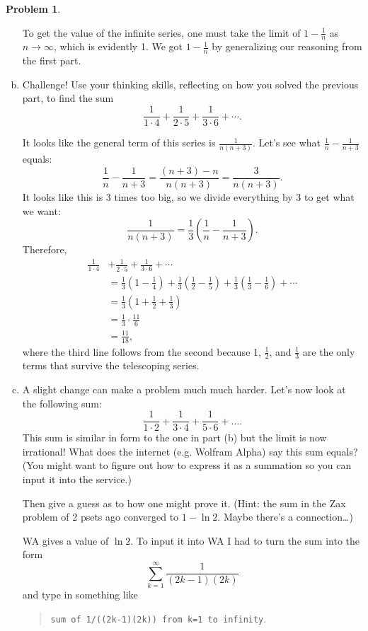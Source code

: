 \documentclass[11pt,oneside]{amsart}
\theoremstyle{definition}
\newtheorem{problem}{Problem}
\theoremstyle{plain}
\begin{document}
\begin{problem}
\begin{enumerate}[(a)]
\begin{solution}
          To get the value of the infinite series, one must take the limit of $1-\frac 1n$ as $n\to\infty$, which is evidently 1. We got $1-\frac 1n$ by generalizing our reasoning from the first part.
        \end{solution}
  \item Challenge! Use your thinking skills, reflecting on how you solved the previous part, to find the sum
        \[\frac1{1\cdot 4}+\frac 1{2\cdot 5}+\frac 1{3\cdot 6}+\cdots.\]
        \begin{solution}
          It looks like the general term of this series is $\frac 1{n(n+3)}$. Let's see what $\frac 1n-\frac 1{n+3}$ equals:
          \[\frac 1n-\frac 1{n+3}=\frac{(n+3)-n}{n(n+3)}=\frac 3{n(n+3)}.\]
          It looks like this is 3 times too big, so we divide everything by 3 to get what we want:
          \[\frac 1{n(n+3)}=\frac 13\left( \frac 1n-\frac 1{n+3} \right).\]
          Therefore,
          \[\begin{split}
              \frac 1{1\cdot 4}&+\frac 1{2\cdot 5}+\frac 1{3\cdot 6}+\cdots \\
              &=\frac 13\left( 1-\frac 14 \right)+\frac 13\left( \frac12-\frac 15 \right)+\frac 13\left( \frac13-\frac 16 \right)+\cdots\\
              &= \frac 13\left(1+\frac 12+\frac 13\right)\\
              &=\frac 13\cdot \frac{11}6\\
              &=\frac{11}{18},
            \end{split}\]
          where the third line follows from the second because 1, $\frac12$, and $\frac13$ are the only terms that survive the telescoping series.
        \end{solution}
  \item A slight change can make a problem much much harder. Let's now look at the following sum:
        \[\frac 1{1\cdot 2}+\frac 1{3\cdot 4}+\frac 1{5\cdot 6}+\dots.\]
        This sum is similar in form to the one in part (b) but the limit is now irrational! What does the internet (e.g. Wolfram Alpha) say this sum equals? (You might want to figure out how to express it as a summation so you can input it into the service.)

        Then give a guess as to how one might prove it. (Hint: the sum in the Zax problem of 2 psets ago converged to $1-\ln 2$. Maybe there's a connection\ldots)
        \begin{solution}
          WA gives a value of $\ln 2$. To input it into WA I had to turn the sum into the form
          \[\sum_{k=1}^\infty \frac 1{(2k-1)(2k)}\]
          and type in something like
          \begin{quote}
            \texttt{sum of 1/((2k-1)(2k)) from k=1 to infinity}.
          \end{quote}


\end{solution}
\end{enumerate}
\end{problem}
\end{document}
